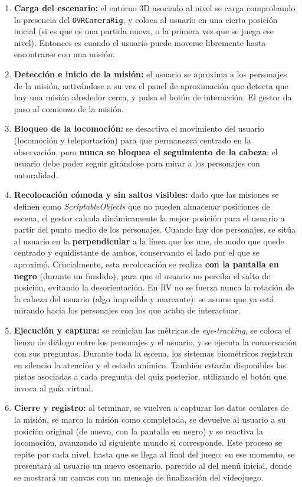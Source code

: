 \documentclass[12pt,twoside,titlepage]{report}
\begin{document}
\begin{enumerate}[label=\textbf{\arabic*.}, leftmargin=1.5cm, itemsep=0.5em]
  \item \textbf{Carga del escenario:} el entorno 3D asociado al nivel se carga comprobando la presencia del \texttt{OVRCameraRig}, y coloca al usuario en una cierta posición inicial (si es que es una partida nueva, o la primera vez que se juega ese nivel).
  Entonces es cuando el usuario puede moverse libremente hasta encontrarse con una misión.
  \item \textbf{Detección e inicio de la misión:} el usuario se aproxima a los personajes de la misión, activándose a su vez el panel de aproximación que detecta que hay una misión alrededor cerca, y pulsa el botón de interacción.
El gestor da paso al comienzo de la misión.
  \item \textbf{Bloqueo de la locomoción:} se desactiva el movimiento del usuario (locomoción y teleportación) para que permanezca centrado en la observación, pero \textbf{nunca se bloquea el seguimiento de la cabeza}: el usuario debe poder seguir girándose para mirar a los personajes con naturalidad.
  \item \textbf{Recolocación cómoda y sin saltos visibles:} dado que las misiones se definen como \textit{ScriptableObjects} que no pueden almacenar posiciones de escena, el gestor calcula dinámicamente la mejor posición para el usuario a partir del punto medio de los personajes.
Cuando hay dos personajes, se sitúa al usuario en la \textbf{perpendicular} a la línea que los une, de modo que quede centrado y equidistante de ambos, conservando el lado por el que se aproximó.
Crucialmente, esta recolocación se realiza \textbf{con la pantalla en negro} (durante un fundido), para que el usuario no perciba el salto de posición, evitando la desorientación.
En RV no se fuerza nunca la rotación de la cabeza del usuario (algo imposible y mareante): se asume que ya está mirando hacia los personajes con los que acaba de interactuar.
  \item \textbf{Ejecución y captura:} se reinician las métricas de \textit{eye-tracking}, se coloca el lienzo de diálogo entre los personajes y el usuario, y se ejecuta la conversación con sus preguntas.
Durante toda la escena, los sistemas biométricos registran en silencio la atención y el estado anímico.
También estarán disponibles las pistas asociadas a cada pregunta del quiz posterior, utilizando el botón que invoca al guía virtual.
  \item \textbf{Cierre y registro:} al terminar, se vuelven a capturar los datos oculares de la misión, se marca la misión como completada, se devuelve al usuario a su posición original (de nuevo, con la pantalla en negro) y se reactiva la locomoción, avanzando al siguiente mundo si corresponde.
Este proceso se repite por cada nivel, hasta que se llega al final del juego: en ese momento, se presentará al usuario un nuevo escenario, parecido al del menú inicial, donde se mostrará un canvas con un mensaje de finalización del videojuego.
\end{enumerate}
\end{document}
